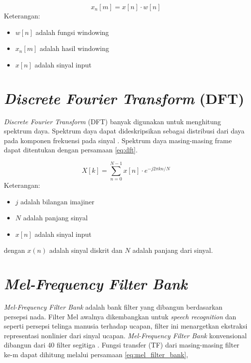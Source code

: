     \begin{equation}
        x_n[m] = x[n] \cdot w[n]
    \label{eq:framing_and_windowing}
    \end{equation}
Keterangan:
\begin{itemize}
    \item $w[n]$ adalah fungsi windowing
    \item $x_n[m]$ adalah hasil windowing
    \item $x[n]$ adalah sinyal input
\end{itemize}

    \section{\textit{Discrete Fourier Transform} (DFT)}
    \textit{Discrete Fourier Transform} (DFT) banyak digunakan untuk menghitung spektrum daya. Spektrum daya dapat dideskripsikan sebagai distribusi dari daya pada komponen frekuensi pada sinyal \cite{feldman1993power}. Spektrum daya masing-masing frame dapat ditentukan dengan persamaan \ref{eq:dft}.

    \begin{equation}
        X[k] = \sum_{n=0}^{N-1} x[n] \cdot e^{-j2\pi kn/N}
    \label{eq:dft}
    \end{equation}
Keterangan:
\begin{itemize}
    \item $j$ adalah bilangan imajiner
    \item $N$ adalah panjang sinyal
    \item $x[n]$ adalah sinyal input
\end{itemize}

    dengan $x(n)$ adalah sinyal diskrit dan $N$ adalah panjang dari sinyal.
    \section{\textit{Mel-Frequency Filter Bank}}
    \textit{Mel-Frequency Filter Bank} adalah bank filter yang dibangun berdasarkan persepsi nada. Filter Mel awalnya dikembangkan untuk \textit{speech recognition} dan seperti persepsi telinga manusia terhadap ucapan, filter ini menargetkan ekstraksi representasi nonlinier dari sinyal ucapan. \textit{Mel-Frequency Filter Bank} konvensional dibangun dari 40 filter segitiga \cite{YIN2011707}. Fungsi transfer (TF) dari masing-masing filter ke-m dapat dihitung melalui persamaan \ref{eq:mel_filter_bank},


